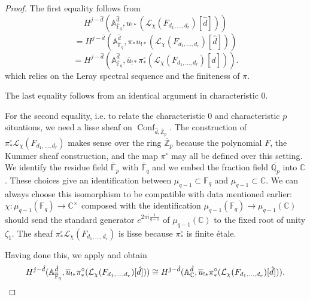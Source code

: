 \documentclass[11pt,letterpaper]{article}
\theoremstyle{definition}
\theoremstyle{remark}
\numberwithin{equation}{section}
\theoremstyle{dotless}
\newcommand{\gene}{\zeta_1} %
\begin{document}
\begin{proof} The first equality follows from
\[ H^{j-\hat{d}} ( \mathbb A^{\hat{d} }_{\overline{\mathbb F}_q}, u_{!*} (\mathcal L_{\chi}(F_{d_1,\dots,d_r}) [\hat{d}])) \] \[= H^{j-\hat{d}} ( \mathbb A^{\hat{d} }_{\overline{\mathbb F}_q},  \pi_* u_{!*} (\mathcal L_{\chi}(F_{d_1,\dots,d_r}) [\hat{d}])) \] \[= H^{j-\hat{d}} ( \mathbb A^{\hat{d} }_{\overline{\mathbb F}_q},  \overline{u} _{!*}  \pi^\circ_* (\mathcal L_{\chi}(F_{d_1,\dots,d_r}) [\hat{d}])).\]
which relies on the Leray spectral sequence and the finiteness of $\pi$.

The last equality follows from an identical argument in characteristic $0$.


For the second equality, i.e. to relate the characteristic $0$ and characteristic $p$ situations, we need a lisse sheaf on $\operatorname{Conf}_{\hat{d}, \overline{\mathbb Z}_p}$. The construction of $\pi^\circ_* \mathcal L_{\chi}(F_{d_1,\dots,d_r})$ makes sense over the ring $\overline{\mathbb Z}_p$ because the polynomial $F$, the Kummer sheaf construction, and the map $\pi^\circ$ may all be defined over this setting. We identify the residue field $\overline{\mathbb F}_p$ with $\overline{\mathbb F}_q$ and we embed the fraction field $\overline{\mathbb Q_p}$ into $\mathbb C$. These choices give an identification between $\mu_{q-1} \subset \mathbb F_q$ and $\mu_{q-1} \subset \mathbb C$. We can always choose this isomorphism to be compatible with data mentioned earlier: $\chi \colon \mu_{q-1} (\mathbb F_q) \to \mathbb C^\times$ composed with the identification $\mu_{q-1}(\mathbb F_q)\to \mu_{q-1}(\mathbb C)$ should send the standard generator $e^{2 \pi i \frac{1}{q-1}}$ of $\mu_{q-1}(\mathbb C)$ to the fixed root of unity $\gene$. The sheaf $\pi^\circ_* \mathcal L_{\chi}(F_{d_1,\dots,d_r})$ is lisse because $\pi^\circ_*$ is finite \'{e}tale.

Having done this, we apply \cite[Theorem A.2]{Chang} and obtain
\[H^{j-\hat{d}} ( \mathbb A^{\hat{d} }_{\overline{\mathbb F}_q},  \overline{u} _{!*}  \pi^\circ_* (\mathcal L_{\chi}(F_{d_1,\dots,d_r}) [\hat{d}])) \cong H^{j-\hat{d}} ( \mathbb A^{\hat{d} }_{\mathbb C},  \overline{u} _{!*}  \pi^\circ_* (\mathcal L_{\chi}(F_{d_1,\dots,d_r}) [\hat{d}])).\qedhere \] \end{proof} 
\end{document}
